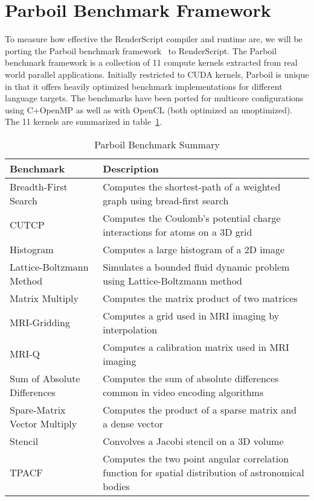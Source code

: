 
\section{Parboil Benchmark Framework}

To measure how effective the RenderScript compiler and runtime
    are, we will be porting the Parboil benchmark framework~\cite{Parboil} to
    RenderScript.
The Parboil benchmark framework is a collection
  of 11 compute kernels extracted from
  real world parallel applications.
Initially restricted to CUDA kernels, Parboil is unique in that it offers
  heavily optimized benchmark implementations for different language targets.
The benchmarks have been ported for multicore configurations using C+OpenMP 
  as well as with OpenCL (both optimized an unoptimized).
The 11 kernels are summarized in table~\ref{table:parboil}.

\begin{table}[h]\footnotesize
\centering
\begin{tabular}{ | l | p{4cm} |}
    \hline 
    Benchmark & Description \\ \hline
    Breadth-First Search & Computes the shortest-path of a weighted graph using bread-first search \\
    CUTCP & Computes the Coulomb's potential charge interactions for atoms on a 3D grid \\
    Histogram & Computes a large histogram of a 2D image \\
    Lattice-Boltzmann Method & Simulates a bounded fluid dynamic problem using Lattice-Boltzmann method \\
    Matrix Multiply & Computes the matrix product of two matrices \\
    MRI-Gridding & Computes a grid used in MRI imaging by interpolation \\
    MRI-Q & Computes a calibration matrix used in MRI imaging \\
    Sum of Absolute Differences & Computes the sum of absolute differences common in video encoding algorithms \\
    Spare-Matrix Vector Multiply & Computes the product of a sparse matrix and a dense vector \\
    Stencil & Convolves a Jacobi stencil on a 3D volume \\
    TPACF & Computes the two point angular correlation function for spatial distribution of astronomical bodies \\   
    \hline
\end{tabular}
\caption{Parboil Benchmark Summary}
\label{table:parboil}
\end{table}

